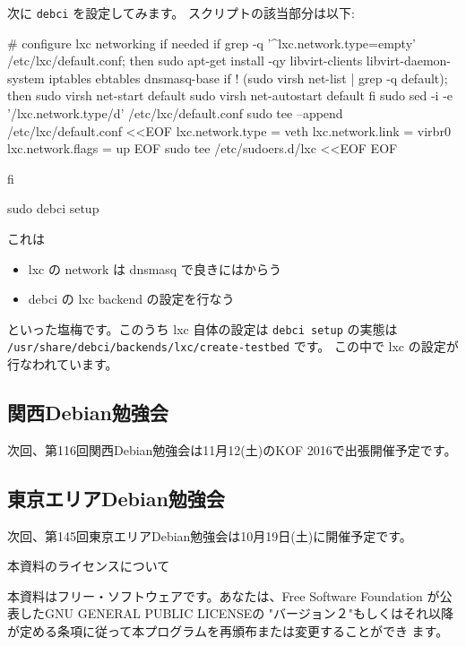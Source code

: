 \documentclass[mingoth,a4paper]{jsarticle}
\begin{document}
次に \texttt{debci} を設定してみます。
スクリプトの該当部分は以下:
\begin{commandline}
# configure lxc networking if needed
if grep -q '^lxc.network.type\s*=\s*empty' /etc/lxc/default.conf; then
  sudo apt-get install -qy libvirt-clients libvirt-daemon-system iptables ebtables dnsmasq-base
  if ! (sudo virsh net-list | grep -q default); then
    sudo virsh net-start default
    sudo virsh net-autostart default
  fi
  sudo sed -i -e '/lxc.network.type/d' /etc/lxc/default.conf
  sudo tee --append /etc/lxc/default.conf <<EOF
lxc.network.type = veth
lxc.network.link = virbr0
lxc.network.flags = up
EOF
  sudo tee /etc/sudoers.d/lxc <<EOF
EOF

fi

sudo debci setup
\end{commandline}
これは
\begin{itemize}
\item %
  lxc の network は dnsmasq で良きにはからう
\item %
  debci の lxc backend の設定を行なう
\end{itemize}
といった塩梅です。このうち lxc 自体の設定は
\texttt{debci setup} の実態は
\texttt{/usr/share/debci/backends/lxc/create-testbed} です。
この中で lxc の設定が行なわれています。



\subsection{関西Debian勉強会}
次回、第116回関西Debian勉強会は11月12(土)のKOF 2016で出張開催予定です。

\subsection{東京エリアDebian勉強会}
次回、第145回東京エリアDebian勉強会は10月19日(土)に開催予定です。

%
\mbox{}\newpage
\mbox{}\newpage

\pagebreak

\begin{center}
本資料のライセンスについて
\end{center}

本資料はフリー・ソフトウェアです。あなたは、Free Software
Foundation が公表したGNU GENERAL PUBLIC LICENSEの "バージョン２"もしくはそれ以降
が定める条項に従って本プログラムを再頒布または変更することができ
ます。
\end{document}
